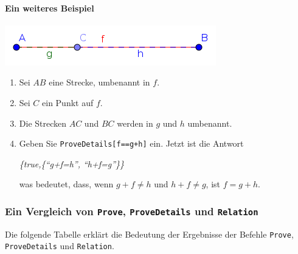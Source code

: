 \documentclass{article}
\begin{document}
\paragraph{Ein weiteres Beispiel}
\begin{center}
\includegraphics[scale=0.5]{ProveDetails-example-2}
\end{center}
\begin{enumerate}
    \item Sei $AB$ eine Strecke, umbenannt in $f$.
    \item Sei $C$ ein Punkt auf $f$.
    \item Die Strecken $AC$ und $BC$ werden in  $g$ und $h$ umbenannt.
    \item Geben Sie \texttt{ProveDetails[f==g+h]} ein. Jetzt ist die Antwort
    \begin{center}
        \textit{\{true,\{``g+f=h'', ``h+f=g''\}\}} 
    \end{center}
    was bedeutet, dass, wenn $g+f\neq h$ und $h+f\neq g$, ist $f=g+h$.
\end{enumerate}

\subsubsection{Ein Vergleich von \texttt{Prove}, \texttt{ProveDetails} und \texttt{Relation}}
\label{Erklaerungstabelle}

Die folgende Tabelle erklärt die Bedeutung der Ergebnisse der Befehle \texttt{Prove},
\texttt{ProveDetails} und \texttt{Relation}.
\end{document}
